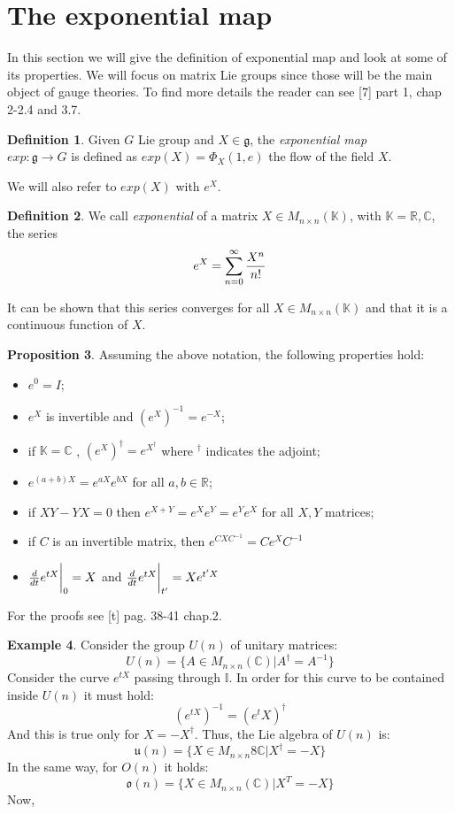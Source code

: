 \documentclass[12pt,a4paper]{report}
\theoremstyle{definition}
\newtheorem{Def}{Definition}[chapter]
\theoremstyle{Theorem}
\newtheorem{Prop}[Def]{Proposition}
\theoremstyle{definition}
\newtheorem{Ex}[Def]{Example}
\theoremstyle{definition}
\begin{document}
	\section{The exponential map}
	In this section we will give the definition of exponential map and look at some of its properties. We will focus on matrix Lie groups since those will be the main object of gauge theories.
	To find more details the reader can see [7] part 1, chap 2-2.4 and 3.7.
	\begin{Def}
		Given $G$ Lie group and $X\in\mathfrak{g}$, the \textit{exponential map} \\$exp:\mathfrak{g}\rightarrow G$ is defined as $exp(X)=\Phi_X(1,e)$ the flow of the field $X$.
	\end{Def}
	We will also refer to $exp(X)$ with $e^X$.
	\begin{Def}
		We call \textit{exponential} of a matrix $X\in M_{n\times n}(\mathbb{K})$, with $\mathbb{K}=\mathbb{R},\mathbb{C}$, the series $$e^X=\sum_{n=0}^{\infty}{X^n\over n! }$$ 
	\end{Def}
	It can be shown that this series converges for all $X\in M_{n\times n}(\mathbb{K})$ and that it is a continuous function of $X$.
	\begin{Prop}
		Assuming the above notation, the following properties hold:
		\begin{itemize}
			\item $e^0=I$;
			\item $e^X$ is invertible and $(e^X)^{-1}=e^{-X}$;
			\item if $\mathbb{K}=\mathbb{C}$ , $(e^X)^\dagger=e^{X^\dagger}$ where $^\dagger$ indicates the adjoint;
			\item $e^{(a+b)X}=e^{aX}e^{bX}$ for all $a,b\in\mathbb{R}$;
			\item if $XY-YX=0$ then $e^{X+Y}=e^Xe^Y=e^Ye^X$ for all $X,Y$ matrices;\\
			\item if $C$ is an invertible matrix, then $e^{CXC^{-1}}=Ce^XC^{-1}$
			\item ${d\over dt}e^{tX}\bigg{\rvert}_0=X$ and ${d\over dt}e^{tX}\bigg{\rvert}_{t'}=Xe^{t'X}$
		\end{itemize}
	\end{Prop} 
	For the proofs see [t] pag. 38-41 chap.2.\\
	\begin{Ex}\label{Ex_2.5.1}
		Consider the group $U(n)$ of unitary matrices:
		$$U(n)=\{A\in M_{n\times n}(\mathbb{C})|A^\dagger=A^{-1}\}$$
		Consider the curve $e^{tX}$ passing through $\mathbb{I}$. In order for this curve to be contained inside $U(n)$ it must hold:
		$$(e^{tX})^{-1}=(e^tX)^\dagger$$
		And this is true only for $X=-X^\dagger$. Thus, the Lie algebra of $U(n)$ is:
		$$\mathfrak{u}(n)=\{X\in M_{n\times n}8\mathbb{C}|X^\dagger=-X\}$$
		In the same way, for $O(n)$ it holds:
		$$\mathfrak{o}(n)=\{X\in M_{n\times n}(\mathbb{C})| X^T=-X\}$$
		Now, 
	\end{Ex}
\end{document}
